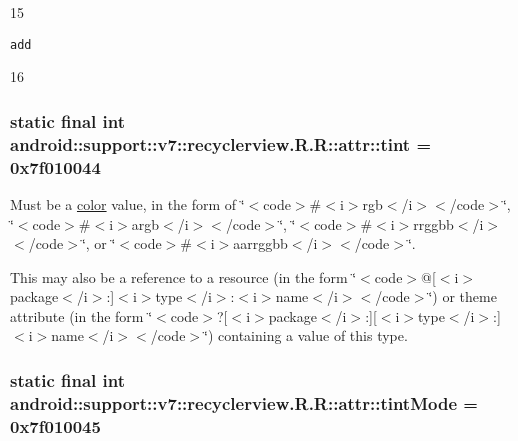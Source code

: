 15

{\tt add}

16\hypertarget{classandroid_1_1support_1_1v7_1_1recyclerview_1_1_r_1_1attr_7a12523ccec9282d046153f3d1d4bcf4}{
\subsubsection[{tint}]{\setlength{\rightskip}{0pt plus 5cm}static final int android::support::v7::recyclerview.R.R::attr::tint = 0x7f010044}}
\label{classandroid_1_1support_1_1v7_1_1recyclerview_1_1_r_1_1attr_7a12523ccec9282d046153f3d1d4bcf4}


Must be a \hyperlink{classandroid_1_1support_1_1v7_1_1recyclerview_1_1_r_1_1color}{color} value, in the form of \char`\"{}$<$code$>$\#$<$i$>$rgb$<$/i$>$$<$/code$>$\char`\"{}, \char`\"{}$<$code$>$\#$<$i$>$argb$<$/i$>$$<$/code$>$\char`\"{}, \char`\"{}$<$code$>$\#$<$i$>$rrggbb$<$/i$>$$<$/code$>$\char`\"{}, or \char`\"{}$<$code$>$\#$<$i$>$aarrggbb$<$/i$>$$<$/code$>$\char`\"{}. 

This may also be a reference to a resource (in the form \char`\"{}$<$code$>$@\mbox{[}$<$i$>$package$<$/i$>$:\mbox{]}$<$i$>$type$<$/i$>$:$<$i$>$name$<$/i$>$$<$/code$>$\char`\"{}) or theme attribute (in the form \char`\"{}$<$code$>$?\mbox{[}$<$i$>$package$<$/i$>$:\mbox{]}\mbox{[}$<$i$>$type$<$/i$>$:\mbox{]}$<$i$>$name$<$/i$>$$<$/code$>$\char`\"{}) containing a value of this type. \hypertarget{classandroid_1_1support_1_1v7_1_1recyclerview_1_1_r_1_1attr_aec6555ca47195c57daebdaa6d1f2c81}{
\subsubsection[{tintMode}]{\setlength{\rightskip}{0pt plus 5cm}static final int android::support::v7::recyclerview.R.R::attr::tintMode = 0x7f010045}}
\label{classandroid_1_1support_1_1v7_1_1recyclerview_1_1_r_1_1attr_aec6555ca47195c57daebdaa6d1f2c81}


